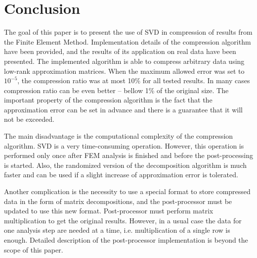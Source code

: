 \section{Conclusion}
\label{sec:conclusion}

The goal of this paper is to present the use of SVD in compression of results from the Finite Element Method. Implementation details of the compression algorithm have been provided, and the results of its application on real data have been presented. The implemented algorithm is able to compress arbitrary data using low-rank approximation matrices. When the maximum allowed error was set to $10^{-5}$, the compression ratio was at most 10\% for all tested results. In many cases compression ratio can be even better -- bellow 1\% of the original size. The important property of the compression algorithm is the fact that the approximation error can be set in advance and there is a guarantee that it will not be exceeded.

The main disadvantage is the computational complexity of the compression algorithm. SVD is a very time-consuming operation. However, this operation is performed only once after FEM analysis is finished and before the post-processing is started. Also, the randomized version of the decomposition algorithm is much faster and can be used if a slight increase of approximation error is tolerated.

Another complication is the necessity to use a special format to store compressed data in the form of matrix decompositions, and the post-processor must be updated to use this new format. Post-processor must perform matrix multiplication to get the original results. However, in a usual case the data for one analysis step are needed at a time, i.e. multiplication of a single row is enough. Detailed description of the post-processor implementation is beyond the scope of this paper.
